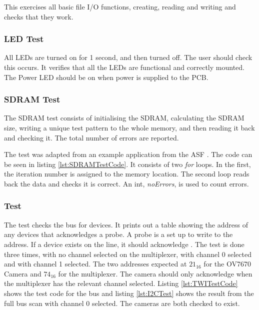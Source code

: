 This exercises all basic file I/O functions, creating, reading and writing and checks that they work.

\subsubsection{LED Test}\label{LED:Test}
All LEDs are turned on for 1 second, and then turned off. The user should check this occurs. It verifies that all the LEDs are functional and correctly mounted. The Power LED should be on when power is supplied to the PCB. 

\subsubsection{SDRAM Test}\label{SDRAM:Test}
The SDRAM test consists of initialising the SDRAM, calculating the SDRAM size, writing a unique test pattern to the whole memory, and then reading it back and checking it. The total number of errors are reported. 

The test was adapted from an example application from the ASF \citep{Atmel:ASF}. The code can be seen in listing \ref{lst:SDRAMTestCode}. It consists of two \textit{for} loops. In the first, the iteration number is assigned to the memory location. The second loop reads back the data and checks it is correct. An int, \textit{noErrors}, is used to count errors. 



\subsubsection{\itc Test}\label{I2C:Test}
The \itc test checks the bus for devices. It prints out a table showing the address of any devices that acknowledges a probe. A probe is a set up to write to the address. If a device exists on the line, it should acknowledge \citep{Philips:I2C}. The test is done three times, with no channel selected on the \itc multiplexer, with channel 0 selected and with channel 1 selected. The two addresses expected at $21_{16}$ for the OV7670 Camera and $74_{16}$ for the \itc multiplexer. The camera should only acknowledge when the \itc multiplexer has the relevant channel selected. Listing \ref{lst:TWITestCode} shows the test code for the \itc bus and listing \ref{lst:I2CTest} shows the result from the full bus scan with channel 0 selected. The cameras are both checked to exist.



